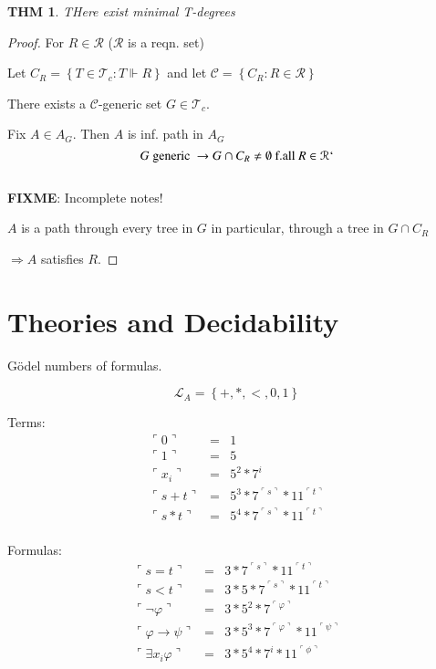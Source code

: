 \documentclass[12pt]{article}
\newcommand{\forces}{\Vdash}
\newcommand{\fixme}{\\ \textbf{FIXME}: Incomplete notes!}
\begin{document}
\newtheorem*{mintdeg}{THM}
\begin{mintdeg}
  THere exist minimal T-degrees
\end{mintdeg}
\begin{proof}
  For $R \in \mathcal{R}$ ($\mathcal{R}$ is a reqn. set)

  Let 
  $C_R = \left\{T\in \mathcal{T}_c : T \forces R \right\}$
  and let 
  $\mathcal{C} = \left\{C_R : R \in \mathcal{R} \right\}$

  There exists a $\mathcal{C}$-generic set $G \in \mathcal{T}_c$.
  
  Fix $A \in A_G$.
  Then $A$ is inf. path in $A_G$
\[
G \text{ generic } \rightarrow G \cap C_R \ne \emptyset \text{ f.all } R \in \mathcal{R}`
\]
\fixme

$A$ is a path through every tree in $G$
in particular, through a tree in $G \cap C_R$

$\Rightarrow A$ satisfies $R$.
\end{proof}

\section{Theories and Decidability}
G\"odel numbers of formulas.

\newcommand{\gn}[1]{\ulcorner #1 \urcorner}

\[
\mathcal{L}_A = \left\{+, *, < , 0, 1\right\}
\]

Terms:
\begin{align*}
  \gn{0} &=& 1 \\
  \gn{1} &=& 5 \\
  \gn{x_i} &=& 5^2 * 7 ^i \\
  \gn{s+t} &=& 5^3 * 7^{\gn{s}} * 11^{\gn{t}} \\
  \gn{s*t} &=& 5^4 * 7^{\gn{s}} * 11^{\gn{t}} \\
\end{align*}

Formulas:
\begin{align*}
  \gn{s=t} &=& 3 * 7^{\gn{s}} * 11^{\gn{t}} \\
  \gn{s<t} &=& 3 * 5 * 7^{\gn{s}} * 11^{\gn{t}} \\
  \gn{\neg \varphi} &=& 3 * 5^2 * 7^{\gn{\varphi}} \\
  \gn{\varphi \rightarrow \psi} &=& 3 * 5^3 * 7^{\gn{\varphi}} * 11^{\gn{\psi}} \\
  \gn{\exists x_i \varphi} &=& 3 * 5^4 * 7^i * 11^{\gn{\phi}} \\
\end{align*}
\end{document}
